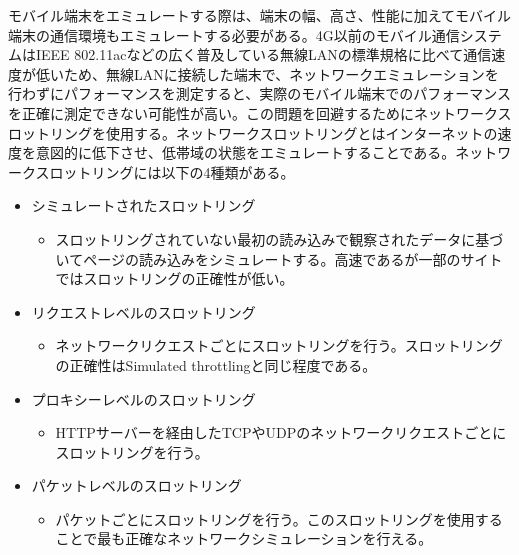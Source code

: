 モバイル端末をエミュレートする際は、端末の幅、高さ、性能に加えてモバイル端末の通信環境もエミュレートする必要がある。4G以前のモバイル通信システムはIEEE 802.11acなどの広く普及している無線LANの標準規格に比べて通信速度が低いため、無線LANに接続した端末で、ネットワークエミュレーションを行わずにパフォーマンスを測定すると、実際のモバイル端末でのパフォーマンスを正確に測定できない可能性が高い。この問題を回避するためにネットワークスロットリングを使用する。ネットワークスロットリングとはインターネットの速度を意図的に低下させ、低帯域の状態をエミュレートすることである。ネットワークスロットリングには以下の4種類がある。

\begin{itemize}
    \item シミュレートされたスロットリング
    \begin{itemize}
        \item スロットリングされていない最初の読み込みで観察されたデータに基づいてページの読み込みをシミュレートする。高速であるが一部のサイトではスロットリングの正確性が低い。
    \end{itemize}
    \item リクエストレベルのスロットリング
    \begin{itemize}
        \item ネットワークリクエストごとにスロットリングを行う。スロットリングの正確性はSimulated throttlingと同じ程度である。
    \end{itemize}
    \item プロキシーレベルのスロットリング
    \begin{itemize}
        \item HTTPサーバーを経由したTCPやUDPのネットワークリクエストごとにスロットリングを行う。
    \end{itemize}
    \item パケットレベルのスロットリング
    \begin{itemize}
        \item パケットごとにスロットリングを行う。このスロットリングを使用することで最も正確なネットワークシミュレーションを行える。
    \end{itemize}
\end{itemize}

